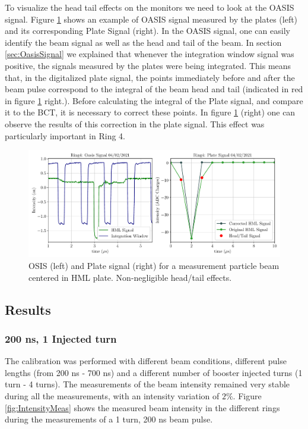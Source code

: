 To visualize the head tail effects on the \hzhm monitors we need to look at the OASIS signal. Figure \ref{fig:HeadTailPlate} shows an example of OASIS signal measured by the plates (left) and its corresponding Plate Signal (right). In the OASIS signal, one can easily identify the beam signal as well as the head and tail of the beam. In section \ref{sec:OasisSignal} we explained that whenever the integration window signal was positive, the signals measured by the plates were being integrated. This means that, in the digitalized plate signal, the points immediately before and after the beam pulse correspond to the integral of the beam head and tail (indicated in red in figure \ref{fig:HeadTailPlate} right.). Before calculating the integral of the Plate signal, and compare it to the BCT, it is necessary to correct these points. In figure \ref{fig:HeadTailPlate} (right) one can observe the results of this correction in the plate signal. This effect was particularly important in Ring 4.

\begin{figure}[h]
    \centering
    \includegraphics[width=1.0\columnwidth]{Figures_BeamTailEffect/Plate_HeadTail.pdf}
    \caption{ OSIS (left) and Plate signal (right) for a measurement particle beam centered in HML plate. Non-negligible head/tail effects.}
    \label{fig:HeadTailPlate}
\end{figure}

\subsection{Results}

\subsubsection{200 ns, 1 Injected turn}

The calibration was performed with different beam conditions, different pulse lengths (from 200 ns - 700 ns) and a different number of booster injected turns (1 turn - 4 turns). The measurements of the beam intensity remained very stable during all the measurements, with an intensity variation of $2\%$. Figure \ref{fig:IntensityMeas} shows the measured beam intensity in the different rings during the measurements of a 1 turn, 200 ns beam pulse. 


